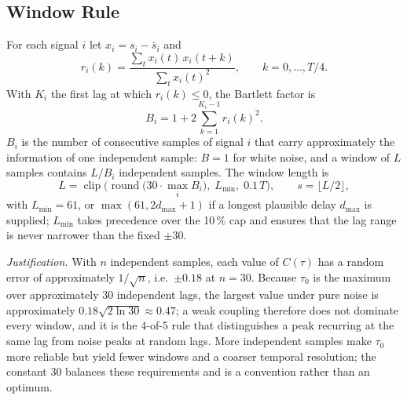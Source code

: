 \documentclass[11pt,a4paper]{article}
\begin{document}
\subsection{Window Rule}
\label{sec:window}
For each signal $i$ let $x_i = s_i - \bar s_i$ and
\begin{equation}
r_i(k) = \frac{\sum_t x_i(t)\, x_i(t+k)}{\sum_t x_i(t)^2}, \qquad k = 0, \dots, T/4 .
\end{equation}
With $K_i$ the first lag at which $r_i(k) \le 0$, the Bartlett factor is
\begin{equation}
B_i = 1 + 2 \sum_{k=1}^{K_i - 1} r_i(k)^2 .
\label{eq:bartlett}
\end{equation}
$B_i$ is the number of consecutive samples of signal $i$ that carry approximately the information of one independent sample: $B = 1$ for white noise, and a window of $L$ samples contains $L / B_i$ independent samples. The window length is
\begin{equation}
L = \operatorname{clip}\!\Big(\operatorname{round}\big(30 \cdot \max_i B_i\big),\; L_{\min},\; 0.1\,T\Big), \qquad s = \lfloor L/2 \rfloor ,
\label{eq:window}
\end{equation}
with $L_{\min} = 61$, or $\max(61, 2 d_{\max} + 1)$ if a longest plausible delay $d_{\max}$ is supplied; $L_{\min}$ takes precedence over the 10\,\% cap and ensures that the lag range is never narrower than the fixed $\pm30$.

\emph{Justification.} With $n$ independent samples, each value of $C(\tau)$ has a random error of approximately $1/\sqrt{n}$, i.e.\ $\pm0.18$ at $n = 30$. Because $\tau_0$ is the maximum over approximately 30 independent lags, the largest value under pure noise is approximately $0.18\sqrt{2\ln 30} \approx 0.47$; a weak coupling therefore does not dominate every window, and it is the 4-of-5 rule that distinguishes a peak recurring at the same lag from noise peaks at random lags. More independent samples make $\tau_0$ more reliable but yield fewer windows and a coarser temporal resolution; the constant 30 balances these requirements and is a convention rather than an optimum.
\end{document}

